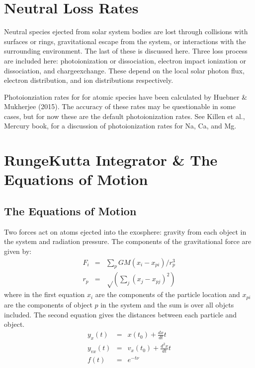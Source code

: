 \documentclass[letterpaper,10pt,english]{sphinxmanual}
\begin{document}
\section{Neutral Loss Rates}
\label{\detokenize{nexoclom2/lossrates:neutral-loss-rates}}\label{\detokenize{nexoclom2/lossrates:lossrates}}\label{\detokenize{nexoclom2/lossrates::doc}}
\sphinxAtStartPar
Neutral species ejected from solar system bodies are lost through collisions
with surfaces or rings, gravitational escape from the system, or interactions
with the surrounding environment. The last of these is discussed here. Three
loss process are included here: photoionization or dissociation, electron impact
ionization or dissociation, and charge\sphinxhyphen{}exchange. These depend on the local
solar photon flux, electron distribution, and ion distributions respectively.

\sphinxAtStartPar
Photoionziation rates for for atomic species have been calculated by Huebner \&
Mukherjee (2015). The accuracy of these rates may be questionable in some cases,
but for now these are the default photoionization rates. See Killen et al.,
Mercury book, for a discussion of photoionization rates for Na, Ca, and Mg.

\sphinxstepscope


\section{Runge\sphinxhyphen{}Kutta Integrator \& The Equations of Motion}
\label{\detokenize{nexoclom2/integrator:runge-kutta-integrator-the-equations-of-motion}}\label{\detokenize{nexoclom2/integrator::doc}}

\subsection{The Equations of Motion}
\label{\detokenize{nexoclom2/integrator:the-equations-of-motion}}
\sphinxAtStartPar
Two forces act on atoms ejected into the exosphere: gravity from each object in
the system and radiation pressure. The components of the gravitational force are
given by:
\begin{equation*}
\begin{split}F_i & = & \sum_p GM (x_i - x_{pi})/r_p^3 \\
r_p & = & \sqrt\left(\sum_j (x_j - x_{pj})^2\right)\end{split}
\end{equation*}
\sphinxAtStartPar
where in the first equation \(x_i\) are the components of the particle
location and \(x_{pi}\) are the components of object \(p\) in the
system and the sum is over all objcts included. The second equation gives the
distances between each particle and object.
\begin{equation*}
\begin{split}y_x(t) & = & x(t_0) + \frac{dx}{dt} t \\
y_{vx}(t) & = & v_x(t_0) + \frac{d^2x}{dt} t \\
f(t) & = & e^{-t \nu}\end{split}
\end{equation*}
\sphinxstepscope
\end{document}

